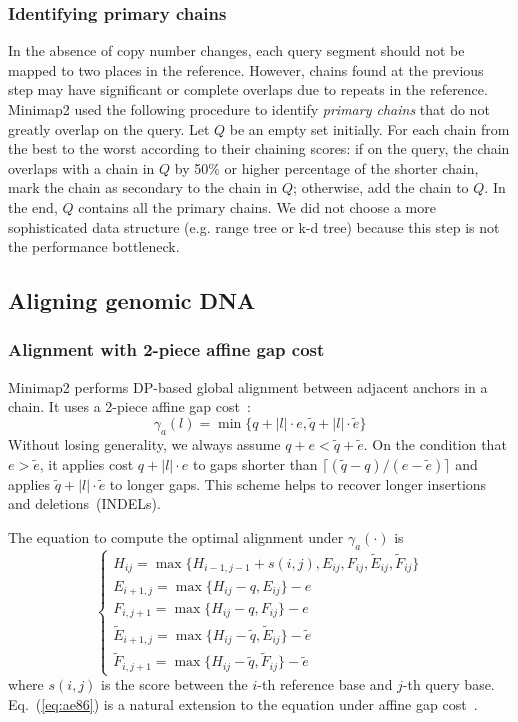 \documentclass{bioinfo}
\begin{document}
\begin{methods}
\subsubsection{Identifying primary chains}
In the absence of copy number changes, each query segment should not be mapped
to two places in the reference. However, chains found at the previous step may
have significant or complete overlaps due to repeats in the reference.
Minimap2 used the following procedure to identify \emph{primary chains} that do
not greatly overlap on the query. Let $Q$ be an empty set initially. For each
chain from the best to the worst according to their chaining scores: if on the
query, the chain overlaps with a chain in $Q$ by 50\% or higher percentage of
the shorter chain, mark the chain as secondary to the chain in $Q$; otherwise,
add the chain to $Q$. In the end, $Q$ contains all the primary chains. We did
not choose a more sophisticated data structure (e.g. range tree or k-d tree)
because this step is not the performance bottleneck.

\subsection{Aligning genomic DNA}

\subsubsection{Alignment with 2-piece affine gap cost}

Minimap2 performs DP-based global alignment between adjacent anchors in a
chain. It uses a 2-piece affine gap cost~\citep{Gotoh:1990aa}:
\begin{equation}\label{eq:2-piece}
\gamma_a(l)=\min\{q+|l|\cdot e,\tilde{q}+|l|\cdot\tilde{e}\}
\end{equation}
Without losing generality, we always assume $q+e<\tilde{q}+\tilde{e}$.
On the condition that $e>\tilde{e}$, it applies cost $q+|l|\cdot e$ to gaps
shorter than $\lceil(\tilde{q}-q)/(e-\tilde{e})\rceil$ and applies
$\tilde{q}+|l|\cdot\tilde{e}$ to longer gaps.  This scheme helps to recover
longer insertions and deletions~(INDELs).

The equation to compute the optimal alignment under $\gamma_a(\cdot)$ is
\begin{equation}\label{eq:ae86}
\left\{\begin{array}{l}
H_{ij} = \max\{H_{i-1,j-1}+s(i,j),E_{ij},F_{ij},\tilde{E}_{ij},\tilde{F}_{ij}\}\\
E_{i+1,j}= \max\{H_{ij}-q,E_{ij}\}-e\\
F_{i,j+1}= \max\{H_{ij}-q,F_{ij}\}-e\\
\tilde{E}_{i+1,j}= \max\{H_{ij}-\tilde{q},\tilde{E}_{ij}\}-\tilde{e}\\
\tilde{F}_{i,j+1}= \max\{H_{ij}-\tilde{q},\tilde{F}_{ij}\}-\tilde{e}
\end{array}\right.
\end{equation}
where $s(i,j)$ is the score between the $i$-th reference base and $j$-th query
base. Eq.~(\ref{eq:ae86}) is a natural extension to the equation under affine
gap cost~\citep{Gotoh:1982aa,Altschul:1986aa}.


\end{methods}
\end{document}
